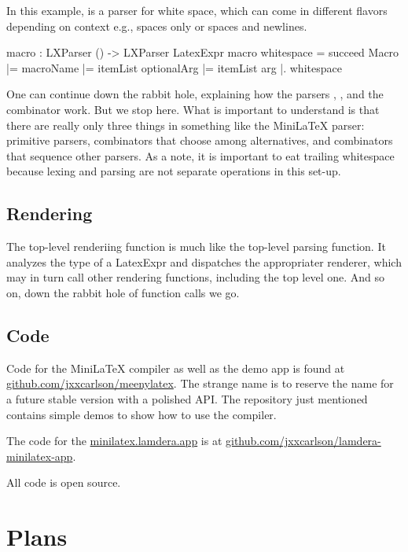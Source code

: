 In this example,  is a parser for white space, which can come in different flavors depending on context e.g., spaces only or spaces and newlines.

\begin{listing}
macro : LXParser () -> LXParser LatexExpr
macro whitespace =
    succeed Macro
        |= macroName
        |= itemList optionalArg
        |= itemList arg
        |. whitespace
\end{listing}

One can continue down the rabbit hole, explaining how the parsers , ,   and the combinator  work.  But we stop here.  What is important to understand is that there are really only three things in something like the MiniLaTeX parser: primitive parsers, combinators that choose among alternatives, and combinators that sequence other parsers. As a note, it is important to eat trailing whitespace because lexing and parsing are not separate operations in this set-up.

\subsection{Rendering}


The top-level renderiing function is much like the top-level parsing function. It analyzes the type of a LatexExpr and dispatches the appropriater renderer, which may in turn call other rendering functions, including the top level one. And so on, down the rabbit hole of function calls we go.


\subsection{Code}

Code for the MiniLaTeX compiler as well as the demo app is found at \href{https://github.com/jxxcarlson/meenylatex}{github.com/jxxcarlson/meenylatex}.  The strange name is to reserve the name  for a future stable version with a polished API.  The repository just mentioned contains simple demos to show how to use the compiler.

The code for the \href{https://minilatex.lamdera.app}{minilatex.lamdera.app} is at \href{https://github.com/jxxcarlson/lamdera-minilatex-app}{github.com/jxxcarlson/lamdera-minilatex-app}.

All code is open source. 

\section{Plans}

